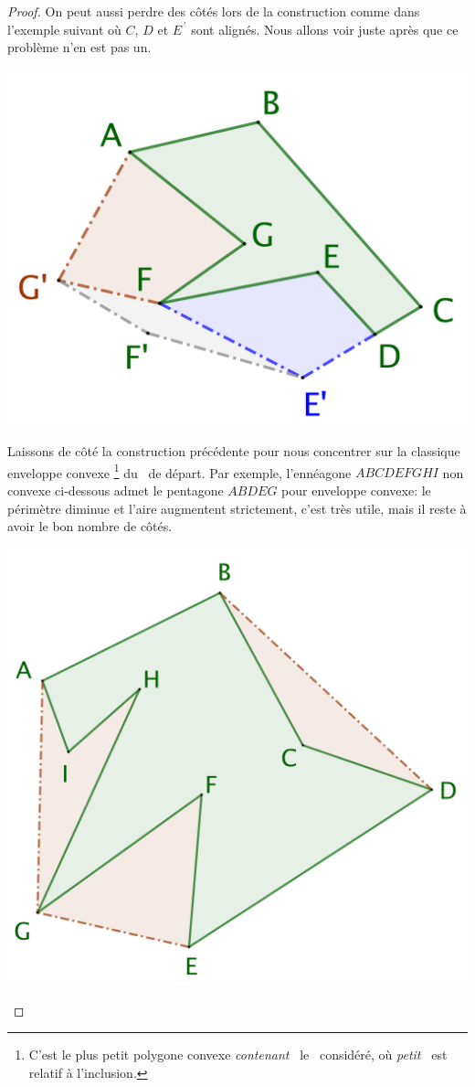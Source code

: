 \begin{proof}
	On peut aussi perdre des côtés lors de la construction comme dans l'exemple suivant où $C$, $D$ et $E^{\,\prime}$ sont alignés. Nous allons voir juste après que ce problème n'en est pas un.

	\begin{center}
		\includegraphics[scale=.4]{content/polygon/non-convex-bad.png}
	\end{center}


	Laissons de côté la construction précédente pour nous concentrer sur la classique enveloppe convexe%
	\footnote{
		C'est le plus petit polygone convexe \og \emph{contenant} \fg\ le \ngone\ considéré, où \og \emph{petit} \fg\ est relatif à l'inclusion.
	}
	du \ngone\ de départ.
	Par exemple, l'ennéagone $ABCDEFGHI$ non convexe ci-dessous admet le pentagone $ABDEG$ pour enveloppe convexe: le périmètre diminue et l'aire augmentent strictement, c'est très utile, mais il reste à avoir le bon nombre de côtés.
	
	\begin{center}
		\includegraphics[scale=.4]{content/polygon/convex-hull.png}
	\end{center}


\end{proof}
